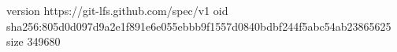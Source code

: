 version https://git-lfs.github.com/spec/v1
oid sha256:805d0d097d9a2e1f891e6e055ebbb9f1557d0840bdbf244f5abc54ab23865625
size 349680
